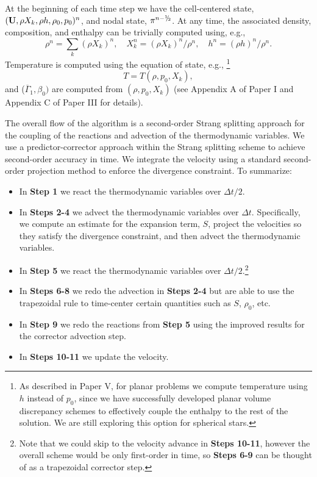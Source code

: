 \documentclass{aastex62}
\newcommand{\sfrac}[2]{\mathchoice
  {\kern0em\raise.5ex\hbox{\the\scriptfont0 #1}\kern-.15em/
   \kern-.15em\lower.25ex\hbox{\the\scriptfont0 #2}}
  {\kern0em\raise.5ex\hbox{\the\scriptfont0 #1}\kern-.15em/
   \kern-.15em\lower.25ex\hbox{\the\scriptfont0 #2}}
  {\kern0em\raise.5ex\hbox{\the\scriptscriptfont0 #1}\kern-.2em/
   \kern-.15em\lower.25ex\hbox{\the\scriptscriptfont0 #2}}
  {#1\!/#2}}
\newcommand{\myhalf}{\sfrac{1}{2}}
\newcommand{\Ub}{{\bf{U}}}
\newcommand{\gammaonebar}{\overline{\Gamma}_1}
\begin{document}
At the beginning of each time step we have the cell-centered state,
$(\Ub,\rho X_k,\rho h,\rho_0,p_0)^n$, and nodal state, $\pi^{n-\myhalf}$.
At any time, the associated density, composition, and enthalpy can be trivially computed using, e.g.,
\begin{equation}
\rho^n = \sum_k(\rho X_k)^n, \quad
X_k^n = (\rho X_k)^n / \rho^n, \quad
h^n = (\rho h)^n / \rho^n.
\end{equation}
Temperature is computed using the equation of state, e.g.,
\footnote{As described in Paper V, for planar problems we compute temperature using $h$ instead of $p_0$, since we have successfully developed planar volume discrepancy schemes to effectively couple the enthalpy to the rest of the solution.  We are still exploring this option for spherical stars.}
\begin{equation}
T = T(\rho,p_0,X_k),
\end{equation}
and ($\gammaonebar,\beta_0)$ are computed from $(\rho,p_0,X_k)$ (see Appendix A of Paper I and Appendix C of Paper III for details).

The overall flow of the algorithm is a second-order Strang splitting approach for the coupling of the reactions and advection of the thermodynamic variables.  
We use a predictor-corrector approach within the Strang splitting scheme to achieve second-order accuracy in time.
We integrate the velocity using a standard second-order projection method to enforce the divergence constraint.
To summarize:
\begin{itemize}
\item In {\bf Step 1} we react the thermodynamic variables over $\Delta t/2$.
\item In {\bf Steps 2-4} we advect the thermodynamic variables over $\Delta t$.  Specifically, we compute an estimate for the expansion term, $S$, project the velocities so they satisfy the divergence constraint, and then advect the thermodynamic variables.
\item In {\bf Step 5} we react the thermodynamic variables over $\Delta t/2$.\footnote{Note that we could skip to the velocity advance in {\bf Steps 10-11}, however the overall scheme would be only first-order in time, so {\bf Steps 6-9} can be thought of as a trapezoidal corrector step.}
\item In {\bf Steps 6-8} we redo the advection in {\bf Steps 2-4} but are able to use the trapezoidal rule to time-center certain quantities such as $S$, $\rho_0$, etc.
\item In {\bf Step 9} we redo the reactions from {\bf Step 5} using the improved results for the corrector advection step.
\item In {\bf Steps 10-11} we update the velocity.
\end{itemize}
\end{document}

